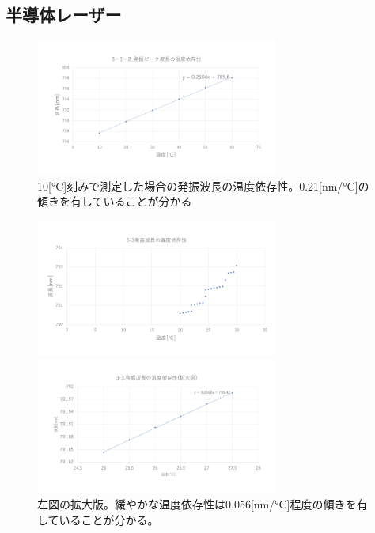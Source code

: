\documentclass[titlepage]{jsarticle}
\begin{document}
\subsection{半導体レーザー}
\begin{figure}[htbp]
 \begin{minipage}{0.5\hsize}
  \begin{center}
   \includegraphics[width=80mm]{3_1_2.png}
  \end{center}
  \caption{10[\si{\degreeCelsius}]刻みで測定した場合の発振波長の温度依存性。0.21[\si{nm/\degreeCelsius}]の傾きを有していることが分かる}
  \label{fig:3-1-2} \end{minipage}
\end{figure}

\begin{figure}[htbp]
 \begin{minipage}{0.5\hsize}
  \begin{center}
   \includegraphics[width=80mm]{3-3.png}
  \end{center}
  \caption{0.5[\si{\degreeCelsius}]刻みで測定した場合の発振波長の温度依存性。モードホッピングが生じていることと、3－1－2で観測されたものより緩やかな温度依存性が生じていることが分かる。なお、文献\cite{laser_base},\cite{text}に記されているようなヒステリシスは観測できなかった。}
  \label{fig:3-3}
 \end{minipage}
 \begin{minipage}{0.5\hsize}
  \begin{center}
   \includegraphics[width=80mm]{3-3-large.png}
  \end{center}
  \caption{左図の拡大版。緩やかな温度依存性は0.056[\si{nm/\degreeCelsius}]程度の傾きを有していることが分かる。}
  \label{fig:3-3-expand}
 \end{minipage}
\end{figure}
\end{document}
